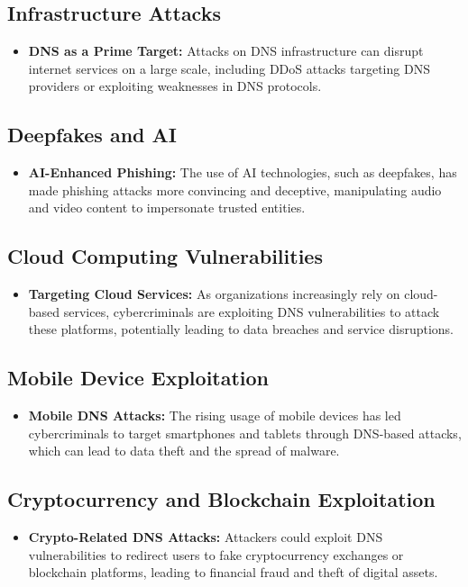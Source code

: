\subsection{Infrastructure Attacks}
\begin{itemize}
    \item \textbf{DNS as a Prime Target:} Attacks on DNS infrastructure can disrupt internet services on a large scale, including DDoS attacks targeting DNS providers or exploiting weaknesses in DNS protocols.\cite{dotmagazine2022dnsabuse, dooley2017dns}
\end{itemize}

\subsection{Deepfakes and AI}
\begin{itemize}
    \item \textbf{AI-Enhanced Phishing:} The use of AI technologies, such as deepfakes, has made phishing attacks more convincing and deceptive, manipulating audio and video content to impersonate trusted entities.\cite{icann2022dnsabusetrends, schick2020deep}
\end{itemize}

\subsection{Cloud Computing Vulnerabilities}
\begin{itemize}
    \item \textbf{Targeting Cloud Services:} As organizations increasingly rely on cloud-based services, cybercriminals are exploiting DNS vulnerabilities to attack these platforms, potentially leading to data breaches and service disruptions.\cite{mather2009cloud}
\end{itemize}

\subsection{Mobile Device Exploitation}
\begin{itemize}
    \item \textbf{Mobile DNS Attacks:} The rising usage of mobile devices has led cybercriminals to target smartphones and tablets through DNS-based attacks, which can lead to data theft and the spread of malware.\cite{au2016mobile}
\end{itemize}

\subsection{Cryptocurrency and Blockchain Exploitation}
\begin{itemize}
    \item \textbf{Crypto-Related DNS Attacks:} Attackers could exploit DNS vulnerabilities to redirect users to fake cryptocurrency exchanges or blockchain platforms, leading to financial fraud and theft of digital assets.\cite{bashir2019advanced}
\end{itemize}


